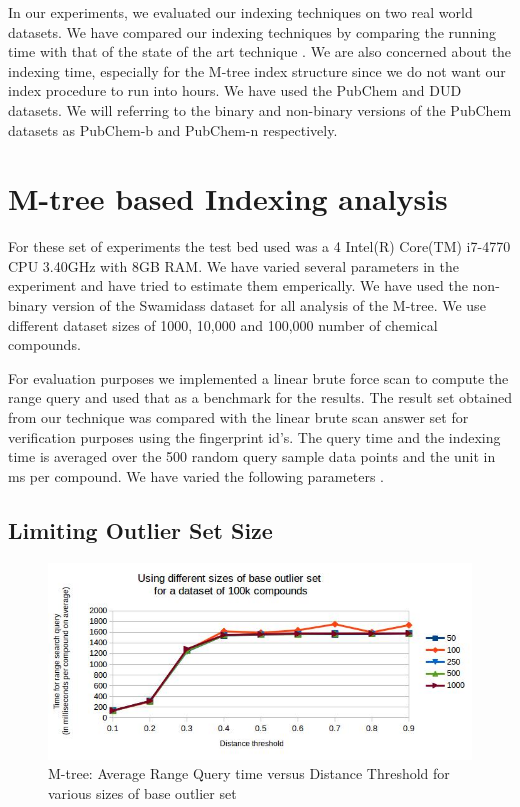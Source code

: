 
In our experiments, we evaluated our indexing techniques on two real world datasets. We have compared our indexing techniques by comparing the running time with that of the state of the art technique  . We are also concerned about the indexing time, especially for the M-tree index structure since we do not want our index procedure to run into hours. We have used the PubChem and DUD datasets. We will referring to the binary and non-binary versions of the PubChem datasets as PubChem-b and PubChem-n respectively.


\section{M-tree based Indexing analysis}	

For these set of experiments the test bed used was a 4 Intel(R) Core(TM) i7-4770 CPU \@ 3.40GHz with 8GB RAM. We have varied several parameters in the experiment and have tried to estimate them emperically. We have used the non-binary version of the Swamidass dataset for all analysis of the M-tree. We use different dataset sizes of 1000, 10,000 and 100,000 number of chemical compounds.

For evaluation purposes we implemented a linear brute force scan to compute the range query and used that as a benchmark for the results. The result set obtained from our technique was compared with the linear brute scan answer set for verification purposes using the fingerprint id's. The query time and the indexing time is averaged over the 500 random query sample data points and the unit in ms per compound. We have varied the following parameters .


\subsection{Limiting Outlier Set Size }

\begin{figure}[ht]	
\centering
\includegraphics[width=1 \columnwidth]{img/image1.jpg}
\caption{M-tree: Average Range Query time versus Distance Threshold for various sizes of base outlier set}
\label{fig:5.1}
\end{figure}

